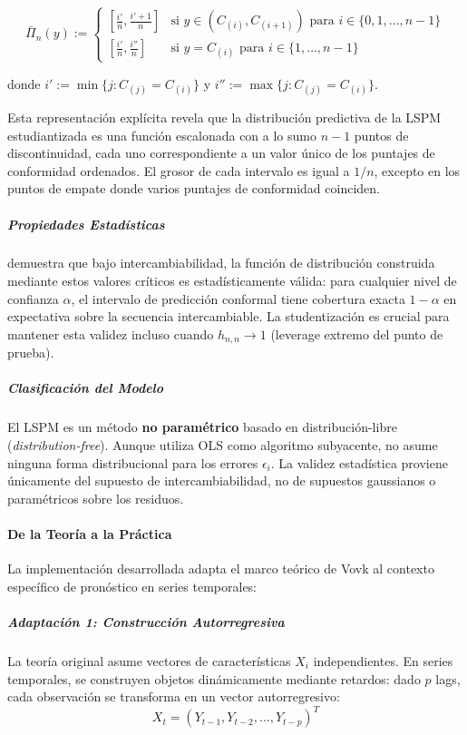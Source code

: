 \begin{equation}
    \bar{\Pi}_n(y) := 
    \begin{cases}
        \left[\frac{i'}{n}, \frac{i'+1}{n}\right] & \text{si } y \in (C_{(i)}, C_{(i+1)}) \text{ para } i \in \{0, 1, \ldots, n-1\} \\
        \left[\frac{i'}{n}, \frac{i''}{n}\right] & \text{si } y = C_{(i)} \text{ para } i \in \{1, \ldots, n-1\}
    \end{cases}
\end{equation}

donde $i' := \min\{j : C_{(j)} = C_{(i)}\}$ y $i'' := \max\{j : C_{(j)} = C_{(i)}\}$.

Esta representación explícita revela que la distribución predictiva de la LSPM estudiantizada es una función escalonada con a lo sumo $n-1$ puntos de discontinuidad, cada uno correspondiente a un valor único de los puntajes de conformidad ordenados. El grosor de cada intervalo es igual a $1/n$, excepto en los puntos de empate donde varios puntajes de conformidad coinciden.


\subparagraph{Propiedades Estadísticas}
\textcite{Vovk2022} demuestra que bajo intercambiabilidad, la función de distribución construida mediante estos valores críticos es estadísticamente válida: para cualquier nivel de confianza $\alpha$, el intervalo de predicción conformal tiene cobertura exacta $1-\alpha$ en expectativa sobre la secuencia intercambiable. La studentización es crucial para mantener esta validez incluso cuando $h_{n,n} \to 1$ (leverage extremo del punto de prueba).

\subparagraph{Clasificación del Modelo}
El LSPM es un método \textbf{no paramétrico} basado en distribución-libre (\textit{distribution-free}). Aunque utiliza OLS como algoritmo subyacente, no asume ninguna forma distribucional para los errores $\epsilon_i$. La validez estadística proviene únicamente del supuesto de intercambiabilidad, no de supuestos gaussianos o paramétricos sobre los residuos.

\paragraph{De la Teoría a la Práctica}

La implementación desarrollada adapta el marco teórico de Vovk al contexto específico de pronóstico en series temporales:

\subparagraph{Adaptación 1: Construcción Autorregresiva}
La teoría original asume vectores de características $X_i$ independientes. En series temporales, se construyen objetos dinámicamente mediante retardos: dado $p$ lags, cada observación se transforma en un vector autorregresivo:
\begin{equation}
X_t = (Y_{t-1}, Y_{t-2}, \dots, Y_{t-p})^T
\end{equation}

